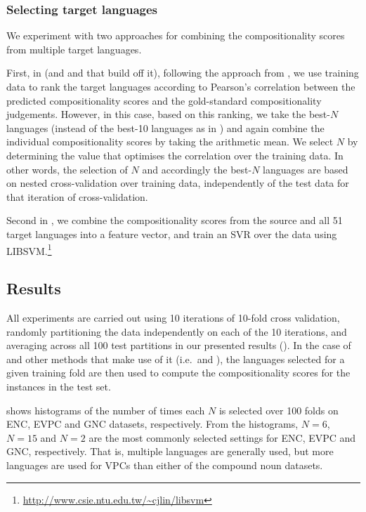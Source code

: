\documentclass[output=paper
,modfonts
,nonflat]{langsci/langscibook}
\begin{document}
\subsubsection{Selecting target languages}
\label{sec:lang-selection}

We experiment with two approaches for combining the compositionality
scores from multiple target languages.

First, in \CStarg (and \CSsourcetarg and \CSall that build off it),
following the approach from , we use
training data to rank the target languages according to Pearson's
correlation between the predicted compositionality scores and the
gold-standard compositionality judgements. However, in this case,
based on this ranking, we take the best-$N$ languages (instead of the
best-10 languages as in ) and again
combine the individual compositionality scores by taking the
arithmetic mean. We select $N$ by determining the value that optimises
the correlation over the training data. In other words, the selection
of $N$ and accordingly the best-$N$ languages are based on nested
cross-validation over training data, independently of the test data
for that iteration of cross-validation.

Second in \CSsvr, we combine the compositionality scores from the
source and all 51 target languages into a feature vector, and train an
SVR over the data using
LIBSVM.\footnote{\smaller\url{http://www.csie.ntu.edu.tw/~cjlin/libsvm}}


\subsection{Results}

All experiments are carried out using 10 iterations of 10-fold cross
validation, randomly partitioning the data independently on each of the
10 iterations, and averaging across all 100 test partitions in our
presented results (). In the case of \CStarg and other methods that make
use of it (i.e.\ \CSsourcetarg and \CSall), the languages selected for a
given training fold are then used to compute the compositionality scores
for the instances in the test set. 

 shows histograms of the number of times each
$N$ is selected over 100 folds on ENC, EVPC and GNC datasets,
respectively. From the histograms, $N=6$, $N=15$ and $N=2$ are the
most commonly selected settings for ENC, EVPC and GNC,
respectively. That is, multiple languages are generally used, but more
languages are used for  VPCs than either of the compound noun
datasets.
\end{document}
